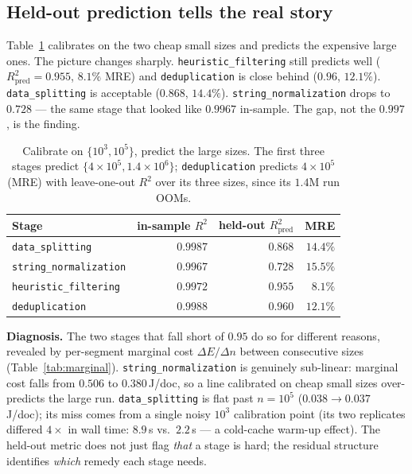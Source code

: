 \documentclass{article}
\begin{document}
\subsection{Held-out prediction tells the real story}

\label{sec:results-heldout}

Table~\ref{tab:heldout} calibrates on the two cheap small sizes and predicts the expensive large ones. The picture changes sharply. \texttt{heuristic\_filtering} still predicts well ($R^2_{\mathrm{pred}} = 0.955$, $8.1\%$ MRE) and \texttt{deduplication} is close behind ($0.96$, $12.1\%$). \texttt{data\_splitting} is acceptable ($0.868$, $14.4\%$). \texttt{string\_normalization} drops to $0.728$ --- the same stage that looked like $0.9967$ in-sample. The gap, not the $0.997$, is the finding.

\begin{table}[ht]
  \centering
  \begin{tabular}{lrrr}
    \toprule
    Stage & in-sample $R^2$ & held-out $R^2_{\mathrm{pred}}$ & MRE \\
    \midrule
    \texttt{data\_splitting}       & $0.9987$ & $0.868$ & $14.4\%$ \\
    \texttt{string\_normalization} & $0.9967$ & $0.728$ & $15.5\%$ \\
    \texttt{heuristic\_filtering}  & $0.9972$ & $0.955$ & $\phantom{0}8.1\%$ \\
    \texttt{deduplication}         & $0.9988$ & $0.960$ & $12.1\%$ \\
    \bottomrule
  \end{tabular}
  \caption{Calibrate on $\{10^3,10^5\}$, predict the large sizes. The first three stages predict $\{4{\times}10^5,1.4{\times}10^6\}$; \texttt{deduplication} predicts $4{\times}10^5$ (MRE) with leave-one-out $R^2$ over its three sizes, since its $1.4$M run OOMs.}
  \label{tab:heldout}
\end{table}

\textbf{Diagnosis.} The two stages that fall short of $0.95$ do so for different reasons, revealed by per-segment marginal cost $\Delta E / \Delta n$ between consecutive sizes (Table~\ref{tab:marginal}). \texttt{string\_normalization} is genuinely sub-linear: marginal cost falls from $0.506$ to $0.380$\,J/doc, so a line calibrated on cheap small sizes over-predicts the large run. \texttt{data\_splitting} is flat past $n=10^5$ ($0.038 \to 0.037$\,J/doc); its miss comes from a single noisy $10^3$ calibration point (its two replicates differed $4\times$ in wall time: $8.9$\,s vs.\ $2.2$\,s --- a cold-cache warm-up effect). The held-out metric does not just flag \emph{that} a stage is hard; the residual structure identifies \emph{which} remedy each stage needs.
\end{document}
